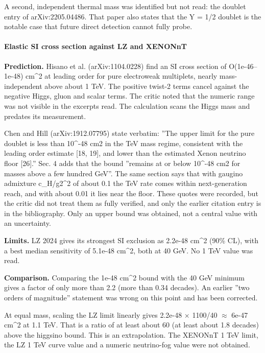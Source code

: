 \documentclass[11pt,a4paper]{article}
\begin{document}
A second, independent thermal mass was identified but not read: the doublet entry of arXiv:2205.04486. That paper also states that the Y = 1/2 doublet is the notable case that future direct detection cannot fully probe.

\paragraph{Elastic SI cross section against LZ and XENONnT}
\textbf{Prediction.} Hisano et al. (arXiv:1104.0228) find an SI cross section of O(1e-46--1e-48) cm\textasciicircum{}2 at leading order for pure electroweak multiplets, nearly mass-independent above about 1 TeV. The positive twist-2 terms cancel against the negative Higgs, gluon and scalar terms. The critic noted that the numeric range was not visible in the excerpts read. The calculation scans the Higgs mass and predates its measurement.

Chen and Hill (arXiv:1912.07795) state verbatim: ''The upper limit for the pure doublet is less than 10\textasciicircum{}-48 cm2 in the TeV mass regime, consistent with the leading order estimate [18, 19], and lower than the estimated Xenon neutrino floor [26].'' Sec. 4 adds that the bound ''remains at or below 10\textasciicircum{}-48 cm2 for masses above a few hundred GeV''. The same section says that with gaugino admixture c\_H/g2\textasciicircum{}2 of about 0.1 the TeV rate comes within next-generation reach, and with about 0.01 it lies near the floor. These quotes were recorded, but the critic did not treat them as fully verified, and only the earlier citation entry is in the bibliography. Only an upper bound was obtained, not a central value with an uncertainty.

\textbf{Limits.} LZ 2024 gives its strongest SI exclusion as 2.2e-48 cm\textasciicircum{}2 (90\% CL), with a best median sensitivity of 5.1e-48 cm\textasciicircum{}2, both at 40 GeV. No 1 TeV value was read.

\textbf{Comparison.} Comparing the 1e-48 cm\textasciicircum{}2 bound with the 40 GeV minimum gives a factor of only more than 2.2 (more than 0.34 decades). An earlier ''two orders of magnitude'' statement was wrong on this point and has been corrected.

At equal mass, scaling the LZ limit linearly gives 2.2e-48 $\times$ 1100/40 $\approx$ 6e-47 cm\textasciicircum{}2 at 1.1 TeV. That is a ratio of at least about 60 (at least about 1.8 decades) above the higgsino bound. This is an extrapolation. The XENONnT 1 TeV limit, the LZ 1 TeV curve value and a numeric neutrino-fog value were not obtained.
\end{document}
